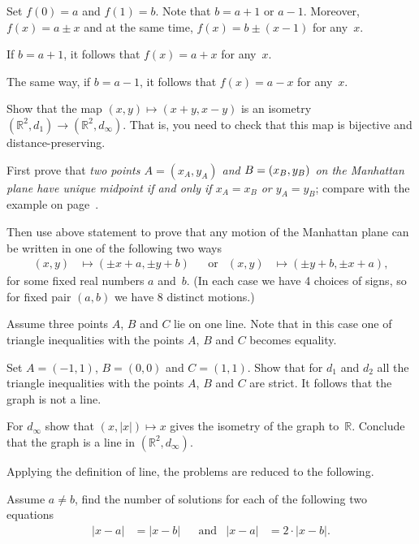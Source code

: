 Set $f(0)=a$ and $f(1)=b$.
Note that $b=a+1$ or $a-1$.
Moreover, $f(x)=a\pm x$ and at the same time, $f(x)=b\pm(x-1)$ for any~$x$.

If $b=a+1$, 
it follows that 
$f(x)=a+x$  for any~$x$.

The same way, if $b=a-1$, 
it follows that 
$f(x)=a-x$  for any~$x$.

Show that the map $(x,y)\mapsto (x+y,x-y)$ is an isometry   $(\mathbb{R}^2,d_1)\to (\mathbb{R}^2,d_\infty)$.
That is, you need to check that this map is bijective and distance-preserving.

First prove that \textit{two points $A=(x_A,y_A)$ and $B\z=(x_B,y_B)$ on the Manhattan plane have unique midpoint if and only if $x_A=x_B$ or $y_A=y_B$}; compare with the example on page~\pageref{example:isometric but not congruent}. 

Then use above statement to prove that
any motion of the Manhattan plane 
can be written in one of the following two ways
\begin{align*}
(x,y)&\mapsto (\pm x+a,\pm y+b)
&&\text{or} 
&(x,y)&\mapsto (\pm y+b,\pm x+a),
\end{align*}
for some fixed real numbers $a$ and~$b$.
(In each case we have 4 choices of signs, so for fixed pair $(a,b)$ we have 8 distinct motions.)

Assume three points $A$, $B$ and $C$ lie on one line.
Note that in this case one of triangle inequalities with the points $A$, $B$ and $C$ becomes equality.

Set $A=(-1,1)$, $B=(0,0)$ and $C=(1,1)$.
Show that for $d_1$ and $d_2$
all the triangle inequalities with the points $A$, $B$ and $C$ are strict.
It follows that the graph is not a line.

For $d_\infty$ show that $(x,|x|)\mapsto x$ gives the isometry of the graph to~$\mathbb{R}$.
Conclude that the graph is a line in $(\mathbb{R}^2,d_\infty)$.



Applying the definition of line,
the problems are reduced to the following.

Assume $a\ne b$,
find the number of solutions for each of the following two equations
\begin{align*}
|x-a|&=|x-b|
&&\text{and}
&|x-a|&=2\cdot |x-b|.
\end{align*}

